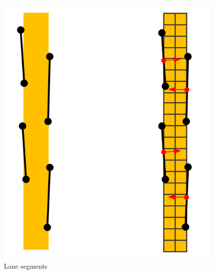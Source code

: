 \documentclass{article}
\begin{document}
\begin{figure}[ht]
  \label{fig:lane_segment}
  \centering
  \includegraphics[scale=0.4]{graphs/segment.PNG}
  \caption{Lane segments}
\end{figure}
\FloatBarrier
\end{document}
